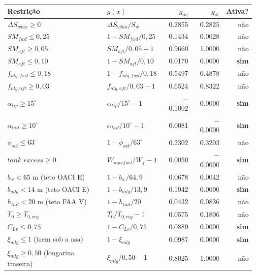 \begin{tabular}{llrrr}
\toprule
Restrição & $g(x)$ & $g_{\mathrm{ini}}$ & $g_{\mathrm{ot}}$ & Ativa? \\
\midrule
$\Delta S_{wlan} \geq 0$ & $\Delta S_{wlan}/S_w$ & 0.2855 & 0.2825 & não \\
$SM_{fwd} \leq 0{,}25$ & $1 - SM_{fwd}/0{,}25$ & 0.1434 & 0.0028 & não \\
$SM_{aft} \geq 0{,}05$ & $SM_{aft}/0{,}05 - 1$ & 0.9660 & 1.0000 & não \\
$SM_{aft} \leq 0{,}10$ & $1 - SM_{aft}/0{,}10$ & 0.0170 & 0.0000 & \textbf{sim} \\
$f_{nlg,fwd} \leq 0{,}18$ & $1 - f_{nlg,fwd}/0{,}18$ & 0.5497 & 0.4878 & não \\
$f_{nlg,aft} \geq 0{,}03$ & $f_{nlg,aft}/0{,}03 - 1$ & 0.6524 & 0.8322 & não \\
$\alpha_{tip} \geq 15^\circ$ & $\alpha_{tip}/15^\circ - 1$ & $-$0.1002 & 0.0000 & \textbf{sim} \\
$\alpha_{tail} \geq 10^\circ$ & $\alpha_{tail}/10^\circ - 1$ & 0.0081 & $-$0.0000 & \textbf{sim} \\
$\phi_{ovt} \leq 63^\circ$ & $1 - \phi_{ovt}/63^\circ$ & 0.2302 & 0.3203 & não \\
$tank\_excess \geq 0$ & $W_{maxfuel}/W_f - 1$ & 0.0050 & $-$0.0000 & \textbf{sim} \\
$b_w < 65$ m (teto OACI E) & $1 - b_w/64{,}9$ & 0.0678 & 0.0042 & não \\
$b_{mlg} < 14$ m (teto OACI E) & $1 - b_{mlg}/13{,}9$ & 0.1942 & 0.0000 & \textbf{sim} \\
$h_{tail} < 20$ m (teto FAA V) & $1 - h_{tail}/20$ & 0.0432 & 0.0836 & não \\
$T_0 \geq T_{0,req}$ & $T_0/T_{0,req} - 1$ & 0.0575 & 0.1806 & não \\
$C_{Lv} \leq 0{,}75$ & $1 - C_{Lv}/0{,}75$ & 0.0889 & 0.0000 & \textbf{sim} \\
$\xi_{mlg} \leq 1$ (trem sob a asa) & $1 - \xi_{mlg}$ & 0.0987 & 0.0000 & \textbf{sim} \\
$\xi_{mlg} \geq 0{,}50$ (longarina traseira) & $\xi_{mlg}/0{,}50 - 1$ & 0.8025 & 1.0000 & não \\
\bottomrule
\end{tabular}